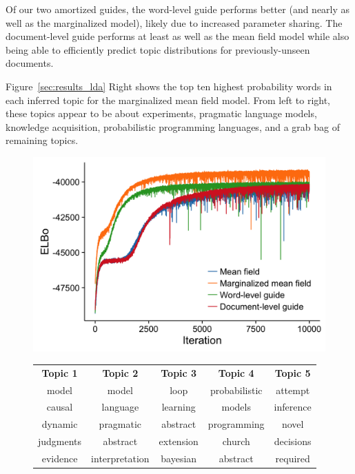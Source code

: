 Of our two amortized guides, the word-level guide performs better (and nearly as well as the marginalized model), likely due to increased parameter sharing. The document-level guide performs at least as well as the mean field model while also being able to efficiently predict topic distributions for previously-unseen documents.

Figure~\ref{sec:results_lda} Right shows the top ten highest probability words in each inferred topic for the marginalized mean field model. From left to right, these topics appear to be about experiments, pragmatic language models, knowledge acquisition, probabilistic programming languages, and a grab bag of remaining topics.

\begin{figure}[!ht]
\begin{minipage}{0.5\linewidth}
\centering
\includegraphics[width=\linewidth]{figs/results/lda/elboProgress.png}
\end{minipage}
%
\begin{minipage}{0.5\linewidth}
\tiny
\centering
\begin{tabular}{c c c c c}
\textbf{Topic 1} & \textbf{Topic 2} & \textbf{Topic 3} & \textbf{Topic 4} & \textbf{Topic 5}\\
model & model & loop & probabilistic & attempt\\
causal & language & learning & models & inference\\
dynamic & pragmatic & abstract & programming & novel\\
judgments & abstract & extension & church & decisions\\
evidence & interpretation & bayesian & abstract & required\\

\end{tabular}
\end{minipage}
\end{figure}

